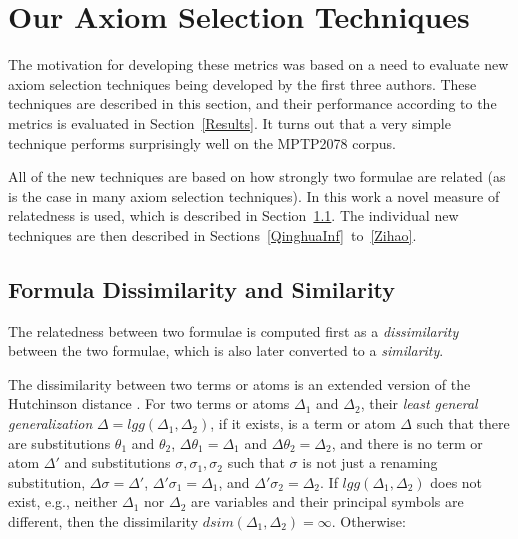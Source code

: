 \documentclass[EPiC]{easychair}
\begin{document}
\section{Our Axiom Selection Techniques}
\label{Ours}

The motivation for developing these metrics was based on a need to evaluate
new axiom selection techniques being developed by the first three authors.
These techniques are described in this section, and their performance
according to the metrics is evaluated in Section~\ref{Results}.
It turns out that a very simple technique performs surprisingly well
on the MPTP2078 corpus.

All of the new techniques are based on how strongly two formulae are
related (as is the case in many axiom selection techniques).
In this work a novel measure of relatedness is used, which is described
in Section~\ref{QinghuaDistance}.
The individual new techniques are then described in 
Sections~\ref{QinghuaInf}~to~\ref{Zihao}.

\subsection{Formula Dissimilarity and Similarity}
\label{QinghuaDistance}

The relatedness between two formulae is computed first as a
\emph{dissimilarity} between the two formulae, which is also later converted
to a \emph{similarity}.

The dissimilarity between two terms or atoms is an extended version of the
Hutchinson distance \cite{Hut97}.
For two terms or atoms $\Delta_1$ and $\Delta_2$, their \emph{least general 
generalization} $\Delta = lgg(\Delta_1,\Delta_2)$, if it exists, is a term 
or atom $\Delta$ such that there are substitutions $\theta_1$ and $\theta_2$, 
$\Delta\theta_1 = \Delta_1$ and $\Delta\theta_2 = \Delta_2$, and 
there is no term or atom $\Delta'$ and substitutions 
$\sigma, \sigma_1, \sigma_2$ such that 
$\sigma$ is not just a renaming substitution,
$\Delta\sigma = \Delta'$, $\Delta'\sigma_1 = \Delta_1$, 
and $\Delta'\sigma_2 = \Delta_2$.
If $lgg(\Delta_1,\Delta_2)$ does not exist, e.g., neither $\Delta_1$ nor
$\Delta_2$ are variables and their principal symbols are different, then the 
dissimilarity $dsim(\Delta_1,\Delta_2) = \infty$.
Otherwise:
\end{document}
